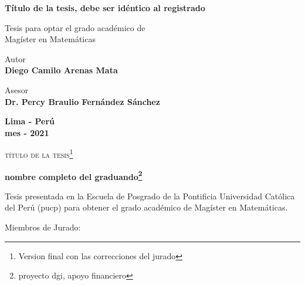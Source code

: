 \documentclass[12pt,a4paper,oneside,reqno]{book}%
\theoremstyle{definition}
\begin{document}
\begin{center}
\begin{minipage}{14.0cm} %
\begin{center}
\textcolor{pucp}{\bf \Huge T\'itulo de la tesis, debe ser id\'entico  al registrado} %
\end{center}
\end{minipage}
\end{center}
\vspace*{2.00cm}
\begin{center}
Tesis para optar el grado acad\'emico de \\%
Mag\'ister en Matem\'aticas  %
\end{center}
%
\vspace*{2.00cm}%
%
\begin{center}
Autor \\%
\textbf{\sc  Diego Camilo Arenas Mata}
\end{center}
%
\vspace*{0.5cm}%
%
\begin{center}
Asesor \\%
\textbf{\sc  Dr. Percy Braulio Fern\'andez S\'anchez} %
\end{center}
%
\vspace*{1.00cm}
%
\begin{center}
{\baselineskip 10pt {\bf Lima - Per\'u} \\ %
{\bf mes - 2021}} %
\end{center}

\newpage %
\thispagestyle{empty}%
\bigskip%
\begin{center}%
\textsc{t\'itulo de la tesis\footnote{Version final con las correcciones del jurado}}%
\end{center}
\smallskip
\begin{center}%
\textbf{nombre completo del graduando\footnote{proyecto dgi, apoyo financiero}}%
\end{center}
%
\par \smallskip %
Tesis presentada en la Escuela de Posgrado de la Pontificia Universidad Cat\'olica del Per\'u ({\sc pucp}) para obtener el grado acad\'emico de Mag\'ister en Matem\'aticas. %
\par
\vspace*{0.5cm}
%
Miembros de Jurado:
\end{document}
